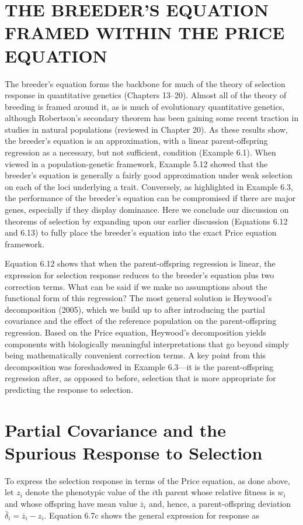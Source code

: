 \documentclass{article}
\begin{document}
\section{THE BREEDER'S EQUATION FRAMED WITHIN THE PRICE EQUATION}
The breeder’s equation forms the backbone for much of the theory of selection response in quantitative genetics (Chapters 13–20). Almost all of the theory of breeding is framed around it, as is much of evolutionary quantitative genetics, although Robertson’s secondary theorem has been gaining some recent traction in studies in natural populations (reviewed in Chapter 20). As these results show, the breeder’s equation is an approximation, with a linear parent-offspring regression as a necessary, but not sufficient, condition (Example 6.1). When viewed in a population-genetic framework, Example 5.12 showed that the breeder’s equation is generally a fairly good approximation under weak selection on each of the loci underlying a trait. Conversely, as highlighted in Example 6.3, the performance of the breeder’s equation can be compromised if there are major genes, especially if they display dominance. Here we conclude our discussion on theorems of selection by expanding upon our earlier discussion (Equations 6.12 and 6.13) to fully place the breeder’s equation into the exact Price equation framework.

Equation 6.12 shows that when the parent-offspring regression is linear, the expression for selection response reduces to the breeder's equation plus two correction terms. What can be said if we make no assumptions about the functional form of this regression? The most general solution is Heywood's decomposition (2005), which we build up to after introducing the partial covariance and the effect of the reference population on the parent-offspring regression. Based on the Price equation, Heywood's decomposition yields components with biologically meaningful interpretations that go beyond simply being mathematically convenient correction terms. A key point from this decomposition was foreshadowed in Example 6.3—it is the parent-offspring regression after, as opposed to before, selection that is more appropriate for predicting the response to selection.

\section{Partial Covariance and the Spurious Response to Selection}
To express the selection response in terms of the Price equation, as done above, let  $ z_i $ denote the phenotypic value of the  $ i $th parent whose relative fitness is  $ w_i $ and whose offspring have mean value  $ \overline{z}_i $ and, hence, a parent-offspring deviation  $ \bar{\delta}_i = \overline{z}_i - z_i $. Equation 6.7c shows the general expression for response as
\end{document}
